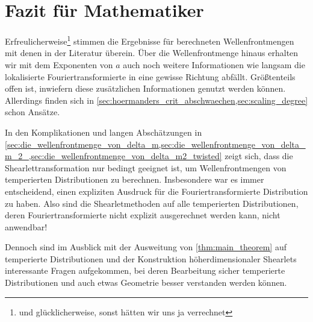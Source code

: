 \section{Fazit für Mathematiker} %
\label{sec:fazit_für_mathematiker}
Erfreulicherweise\footnote{und glücklicherweise, sonst hätten wir uns ja verrechnet} stimmen die Ergebnisse für berechneten Wellenfrontmengen mit denen in der Literatur überein. Über die Wellenfrontmenge hinaus erhalten wir mit dem Exponenten von $a$ auch noch weitere Informationen wie langsam die lokalisierte Fouriertransformierte in eine gewisse Richtung abfällt. Größtenteils offen ist, inwiefern diese zusätzlichen Informationen genutzt werden können. Allerdings finden sich in \cref{sec:hoermanders_crit_abschwaechen,sec:scaling_degree} schon Ansätze.

In den Komplikationen und langen Abschätzungen in \cref{sec:die_wellenfrontmenge_von_delta_m,sec:die_wellenfrontmenge_von_delta_m_2_,sec:die_wellenfrontmenge_von_delta_m2_twisted} zeigt sich, dass die Shearlettransformation nur bedingt geeignet ist, um Wellenfrontmengen von temperierten Distributionen zu berechnen. Insbesondere war es immer entscheidend, einen expliziten Ausdruck für die Fouriertransformierte Distribution zu haben. Also sind die Shearletmethoden auf alle temperierten Distributionen, deren Fouriertransformierte nicht explizit ausgerechnet werden kann, nicht anwendbar!

Dennoch sind im Ausblick mit der Ausweitung von \cref{thm:main_theorem} auf temperierte Distributionen und  der Konstruktion höherdimensionaler Shearlets interessante Fragen aufgekommen, bei deren Bearbeitung sicher temperierte Distributionen und auch etwas Geometrie besser verstanden werden können.

